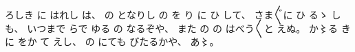ろしき
に
はれし
は、
%
の
となりし
の
を
り
に
ひ
して、
%
さま〴〵に
ひ
るゝ
しも、
%
いつまで
らで
ゆる
の
なるぞや、
%
また
の
の
はべう〳〵と
えぬ。
%
か〻る
きに
をか
て
えし、
%
の
にても
びたるかや、
%
あ〻。


